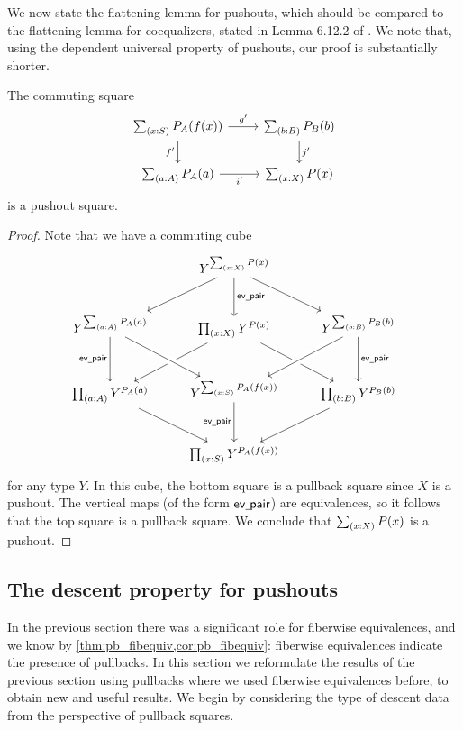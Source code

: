 We now state the flattening lemma for pushouts, which should be compared to the flattening lemma for coequalizers, stated in Lemma 6.12.2 of \cite{hottbook}. We note that, using the dependent universal property of pushouts, our proof is substantially shorter.

\begin{lem}\label{lem:flattening}
The commuting square
\begin{equation*}
\begin{tikzcd}
\sm{x:S}P_A(f(x)) \arrow[d,swap,"{f'}"] \arrow[r,"{g'}"] & \sm{b:B}P_B(b) \arrow[d,"{j'}"] \\
\sm{a:A}P_A(a) \arrow[r,swap,"{i'}"] & \sm{x:X}P(x)
\end{tikzcd}
\end{equation*}
is a pushout square.
\end{lem}

\begin{proof}
Note that we have a commuting cube
\begin{equation*}
\begin{tikzcd}[row sep=large]
& Y^{\sm{x:X}P(x)} \arrow[dl] \arrow[d,"\mathsf{ev\usc{}pair}"] \arrow[dr] \\
Y^{\sm{a:A}P_A(a)} \arrow[d,swap,"\mathsf{ev\usc{}pair}"] & \prd{x:X}Y^{P(x)} \arrow[dl] \arrow[dr] & Y^{\sm{b:B}P_B(b)} \arrow[dl,crossing over] \arrow[d,"\mathsf{ev\usc{}pair}"] \\
\prd{a:A}Y^{P_A(a)} \arrow[dr] & Y^{\sm{x:S}P_A(f(x))} \arrow[from=ul,crossing over] \arrow[d,swap,"\mathsf{ev\usc{}pair}"] & \prd{b:B}Y^{P_B(b)} \arrow[dl] \\
\phantom{\prd{b:B}Y^{P_B(b)}} & \prd{x:S}Y^{P_A(f(x))} & \phantom{\prd{a:A}Y^{P_A(a)}}
\end{tikzcd}
\end{equation*}
for any type $Y$. In this cube, the bottom square is a pullback square since $X$ is a pushout. The vertical maps (of the form $\mathsf{ev\underline{\ }{}pair}$) are equivalences, so it follows that the top square is a pullback square. We conclude that $\sm{x:X}P(x)$ is a pushout.
\end{proof}

\subsection{The descent property for pushouts}

In the previous section there was a significant role for fiberwise equivalences, and we know by \cref{thm:pb_fibequiv,cor:pb_fibequiv}: fiberwise equivalences indicate the presence of pullbacks. In this section we reformulate the results of the previous section using pullbacks where we used fiberwise equivalences before, to obtain new and useful results. We begin by considering the type of descent data from the perspective of pullback squares.

